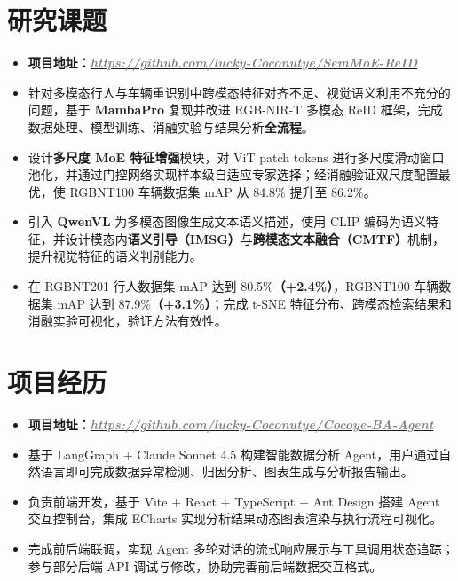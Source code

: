 \documentclass{resume}
\newcommand{\projectlink}[2]{\href{#1}{\textcolor{gray}{\textbf{\textit{#2}}}}}
\begin{document}
\section{研究课题}
\begin{itemize}
  \item \textbf{项目地址：}\projectlink{https://github.com/lucky-Coconutye/SemMoE-ReID}{https://github.com/lucky-Coconutye/SemMoE-ReID}
  \item 针对多模态行人与车辆重识别中跨模态特征对齐不足、视觉语义利用不充分的问题，基于 \textbf{MambaPro} 复现并改进 RGB-NIR-T 多模态 ReID 框架，完成数据处理、模型训练、消融实验与结果分析\textbf{全流程}。
  \item 设计\textbf{多尺度 MoE 特征增强}模块，对 ViT patch tokens 进行多尺度滑动窗口池化，并通过门控网络实现样本级自适应专家选择；经消融验证双尺度配置最优，使 RGBNT100 车辆数据集 mAP 从 84.8\% 提升至 86.2\%。
  \item 引入 \textbf{QwenVL} 为多模态图像生成文本语义描述，使用 CLIP 编码为语义特征，并设计模态内\textbf{语义引导（IMSG）}与\textbf{跨模态文本融合（CMTF）}机制，提升视觉特征的语义判别能力。
  \item 在 RGBNT201 行人数据集 mAP 达到 80.5\%\textbf{（+2.4\%）}，RGBNT100 车辆数据集 mAP 达到 87.9\%\textbf{（+3.1\%）}；完成 t-SNE 特征分布、跨模态检索结果和消融实验可视化，验证方法有效性。
\end{itemize}

\section{项目经历}
\begin{itemize}
  \item \textbf{项目地址：}\projectlink{https://github.com/lucky-Coconutye/Cocoye-BA-Agent}{https://github.com/lucky-Coconutye/Cocoye-BA-Agent}
  \item 基于 LangGraph + Claude Sonnet 4.5 构建智能数据分析 Agent，用户通过自然语言即可完成数据异常检测、归因分析、图表生成与分析报告输出。
  \item 负责前端开发，基于 Vite + React + TypeScript + Ant Design 搭建 Agent 交互控制台，集成 ECharts 实现分析结果动态图表渲染与执行流程可视化。
  \item 完成前后端联调，实现 Agent 多轮对话的流式响应展示与工具调用状态追踪；参与部分后端 API 调试与修改，协助完善前后端数据交互格式。
\end{itemize}
\end{document}
